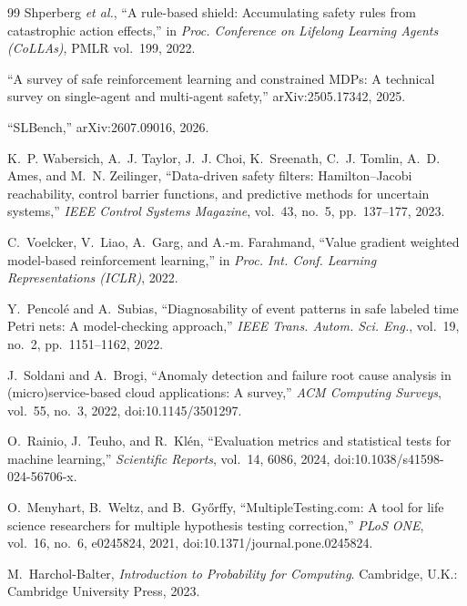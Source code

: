 \documentclass[conference]{IEEEtran}
\begin{document}
\begin{thebibliography}{99}
 Shperberg \emph{et al.}, ``A rule-based shield: Accumulating safety rules from catastrophic action effects,'' in \emph{Proc. Conference on Lifelong Learning Agents (CoLLAs)}, PMLR vol.~199, 2022.

 ``A survey of safe reinforcement learning and constrained MDPs: A technical survey on single-agent and multi-agent safety,'' arXiv:2505.17342, 2025.

 ``SLBench,'' arXiv:2607.09016, 2026.

 K.~P. Wabersich, A.~J. Taylor, J.~J. Choi, K.~Sreenath, C.~J. Tomlin, A.~D. Ames, and M.~N. Zeilinger, ``Data-driven safety filters: Hamilton--Jacobi reachability, control barrier functions, and predictive methods for uncertain systems,'' \emph{IEEE Control Systems Magazine}, vol.~43, no.~5, pp.~137--177, 2023.

 C.~Voelcker, V.~Liao, A.~Garg, and A.-m. Farahmand, ``Value gradient weighted model-based reinforcement learning,'' in \emph{Proc. Int. Conf. Learning Representations (ICLR)}, 2022.

 Y.~Pencol\'e and A.~Subias, ``Diagnosability of event patterns in safe labeled time Petri nets: A model-checking approach,'' \emph{IEEE Trans. Autom. Sci. Eng.}, vol.~19, no.~2, pp.~1151--1162, 2022.

 J.~Soldani and A.~Brogi, ``Anomaly detection and failure root cause analysis in (micro)service-based cloud applications: A survey,'' \emph{ACM Computing Surveys}, vol.~55, no.~3, 2022, doi:10.1145/3501297.

 O.~Rainio, J.~Teuho, and R.~Kl\'en, ``Evaluation metrics and statistical tests for machine learning,'' \emph{Scientific Reports}, vol.~14, 6086, 2024, doi:10.1038/s41598-024-56706-x.

 O.~Menyhart, B.~Weltz, and B.~Gy\H{o}rffy, ``MultipleTesting.com: A tool for life science researchers for multiple hypothesis testing correction,'' \emph{PLoS ONE}, vol.~16, no.~6, e0245824, 2021, doi:10.1371/journal.pone.0245824.

 M.~Harchol-Balter, \emph{Introduction to Probability for Computing}. Cambridge, U.K.: Cambridge University Press, 2023.

\end{thebibliography}
\end{document}
